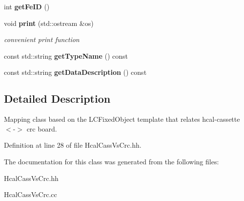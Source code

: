 \begin{DoxyCompactItemize}
\item 
int {\bfseries getFeID} ()\label{classCALICE_1_1HcalCassVsCrc_a9fafc4450edc42942bc6e27400694709}

\item 
void {\bf print} (std::ostream \&os)\label{classCALICE_1_1HcalCassVsCrc_aff5276505cb70e00d8fd8da08a3bc340}

\begin{DoxyCompactList}\small\item\em convenient print function \item\end{DoxyCompactList}\item 
const std::string {\bfseries getTypeName} () const \label{classCALICE_1_1HcalCassVsCrc_a7e060dc4ae6b98c7881e8de228802932}

\item 
const std::string {\bfseries getDataDescription} () const \label{classCALICE_1_1HcalCassVsCrc_a70190ce23db321e7cd2ae283eb2c1f12}

\end{DoxyCompactItemize}


\subsection{Detailed Description}
Mapping class based on the LCFixedObject template that relates hcal-\/cassette $<$-\/$>$ crc board. 

Definition at line 28 of file HcalCassVsCrc.hh.

The documentation for this class was generated from the following files:\begin{DoxyCompactItemize}
\item 
HcalCassVsCrc.hh\item 
HcalCassVsCrc.cc\end{DoxyCompactItemize}
